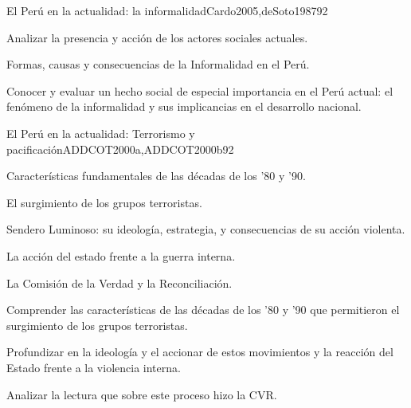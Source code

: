 \begin{syllabus}
\begin{unit}{El Perú en la actualidad: la informalidad}{Cardo2005,deSoto1987}{9}{2}
\begin{topics}
      \item Analizar la presencia y acción de los actores sociales actuales.
      \item Formas, causas y consecuencias de la Informalidad en el Perú.
\end{topics}

\begin{learningoutcomes}
      \item Conocer y evaluar un hecho social de especial importancia en el Perú actual: el fenómeno de la informalidad y sus implicancias en el desarrollo nacional.
\end{learningoutcomes}
\end{unit}

\begin{unit}{El Perú en la actualidad: Terrorismo y pacificación}{ADDCOT2000a,ADDCOT2000b}{9}{2}
\begin{topics}
      \item Características fundamentales de las décadas de los '80 y '90.
      \item El surgimiento de los grupos terroristas.
      \item Sendero Luminoso: su ideología, estrategia, y consecuencias de su acción violenta.
      \item La acción del estado frente a la guerra interna.
      \item La Comisión de la Verdad y la Reconciliación.
\end{topics}
\begin{learningoutcomes}
      \item Comprender las características de las décadas de los '80 y '90 que permitieron el surgimiento de los grupos terroristas.
      \item Profundizar en la ideología y el accionar de estos movimientos y la reacción del Estado frente a la violencia interna.
      \item Analizar la lectura que sobre este proceso hizo la CVR.
\end{learningoutcomes}
\end{unit}

\begin{coursebibliography}
\end{coursebibliography}

\end{syllabus}

%
